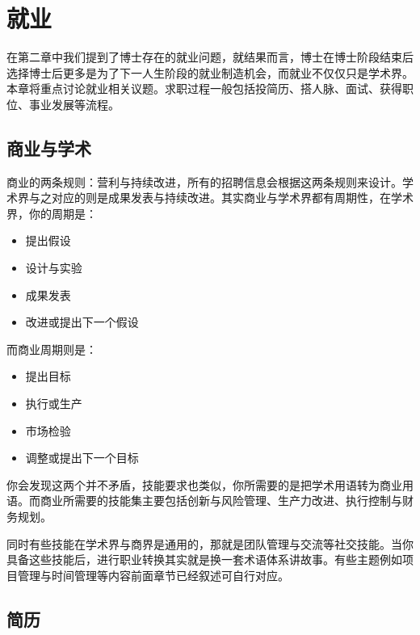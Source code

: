 \documentclass[]{tufte-book}
\providecommand{\tightlist}{%
  \setlength{\itemsep}{0pt}\setlength{\parskip}{0pt}}
\begin{document}
\hypertarget{career}{%
\chapter{就业}\label{career}}

在第二章中我们提到了博士存在的就业问题，就结果而言，博士在博士阶段结束后选择博士后更多是为了下一人生阶段的就业制造机会，而就业不仅仅只是学术界。本章将重点讨论就业相关议题。求职过程一般包括投简历、搭人脉、面试、获得职位、事业发展等流程。

\hypertarget{ux5546ux4e1aux4e0eux5b66ux672f}{%
\section{商业与学术}\label{ux5546ux4e1aux4e0eux5b66ux672f}}

商业的两条规则：营利与持续改进，所有的招聘信息会根据这两条规则来设计。学术界与之对应的则是成果发表与持续改进。其实商业与学术界都有周期性，在学术界，你的周期是：

\begin{itemize}
\tightlist
\item
  提出假设
\item
  设计与实验
\item
  成果发表
\item
  改进或提出下一个假设
\end{itemize}

而商业周期则是：

\begin{itemize}
\tightlist
\item
  提出目标
\item
  执行或生产
\item
  市场检验
\item
  调整或提出下一个目标
\end{itemize}

你会发现这两个并不矛盾，技能要求也类似，你所需要的是把学术用语转为商业用语。而商业所需要的技能集主要包括创新与风险管理、生产力改进、执行控制与财务规划。

同时有些技能在学术界与商界是通用的，那就是团队管理与交流等社交技能。当你具备这些技能后，进行职业转换其实就是换一套术语体系讲故事。有些主题例如项目管理与时间管理等内容前面章节已经叙述可自行对应。

\hypertarget{ux7b80ux5386}{%
\section{简历}\label{ux7b80ux5386}}
\end{document}
